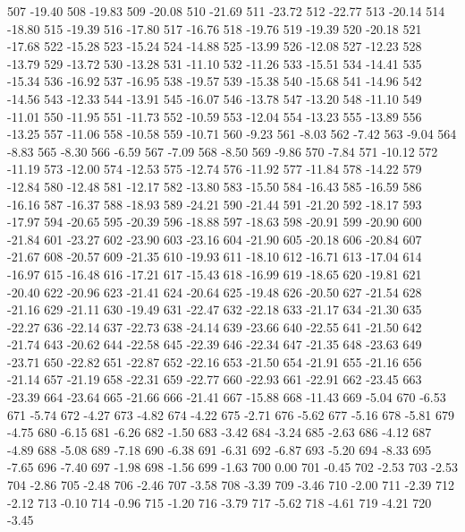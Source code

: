 507 -19.40
508 -19.83
509 -20.08
510 -21.69
511 -23.72
512 -22.77
513 -20.14
514 -18.80
515 -19.39
516 -17.80
517 -16.76
518 -19.76
519 -19.39
520 -20.18
521 -17.68
522 -15.28
523 -15.24
524 -14.88
525 -13.99
526 -12.08
527 -12.23
528 -13.79
529 -13.72
530 -13.28
531 -11.10
532 -11.26
533 -15.51
534 -14.41
535 -15.34
536 -16.92
537 -16.95
538 -19.57
539 -15.38
540 -15.68
541 -14.96
542 -14.56
543 -12.33
544 -13.91
545 -16.07
546 -13.78
547 -13.20
548 -11.10
549 -11.01
550 -11.95
551 -11.73
552 -10.59
553 -12.04
554 -13.23
555 -13.89
556 -13.25
557 -11.06
558 -10.58
559 -10.71
560 -9.23
561 -8.03
562 -7.42
563 -9.04
564 -8.83
565 -8.30
566 -6.59
567 -7.09
568 -8.50
569 -9.86
570 -7.84
571 -10.12
572 -11.19
573 -12.00
574 -12.53
575 -12.74
576 -11.92
577 -11.84
578 -14.22
579 -12.84
580 -12.48
581 -12.17
582 -13.80
583 -15.50
584 -16.43
585 -16.59
586 -16.16
587 -16.37
588 -18.93
589 -24.21
590 -21.44
591 -21.20
592 -18.17
593 -17.97
594 -20.65
595 -20.39
596 -18.88
597 -18.63
598 -20.91
599 -20.90
600 -21.84
601 -23.27
602 -23.90
603 -23.16
604 -21.90
605 -20.18
606 -20.84
607 -21.67
608 -20.57
609 -21.35
610 -19.93
611 -18.10
612 -16.71
613 -17.04
614 -16.97
615 -16.48
616 -17.21
617 -15.43
618 -16.99
619 -18.65
620 -19.81
621 -20.40
622 -20.96
623 -21.41
624 -20.64
625 -19.48
626 -20.50
627 -21.54
628 -21.16
629 -21.11
630 -19.49
631 -22.47
632 -22.18
633 -21.17
634 -21.30
635 -22.27
636 -22.14
637 -22.73
638 -24.14
639 -23.66
640 -22.55
641 -21.50
642 -21.74
643 -20.62
644 -22.58
645 -22.39
646 -22.34
647 -21.35
648 -23.63
649 -23.71
650 -22.82
651 -22.87
652 -22.16
653 -21.50
654 -21.91
655 -21.16
656 -21.14
657 -21.19
658 -22.31
659 -22.77
660 -22.93
661 -22.91
662 -23.45
663 -23.39
664 -23.64
665 -21.66
666 -21.41
667 -15.88
668 -11.43
669 -5.04
670 -6.53
671 -5.74
672 -4.27
673 -4.82
674 -4.22
675 -2.71
676 -5.62
677 -5.16
678 -5.81
679 -4.75
680 -6.15
681 -6.26
682 -1.50
683 -3.42
684 -3.24
685 -2.63
686 -4.12
687 -4.89
688 -5.08
689 -7.18
690 -6.38
691 -6.31
692 -6.87
693 -5.20
694 -8.33
695 -7.65
696 -7.40
697 -1.98
698 -1.56
699 -1.63
700 0.00
701 -0.45
702 -2.53
703 -2.53
704 -2.86
705 -2.48
706 -2.46
707 -3.58
708 -3.39
709 -3.46
710 -2.00
711 -2.39
712 -2.12
713 -0.10
714 -0.96
715 -1.20
716 -3.79
717 -5.62
718 -4.61
719 -4.21
720 -3.45
